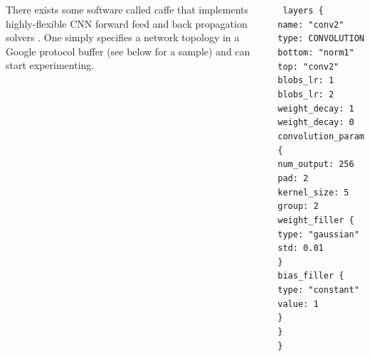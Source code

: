 \documentclass[25pt, a0paper, portrait, margin=0mm, innermargin=15mm,
     blockverticalspace=15mm, colspace=12mm, orientation=landscape]{tikzposter} %
\begin{document}
\begin{columns}
{        \hspace{2em}There exists some software called caffe that implements highly-flexible CNN forward feed and back propagation solvers \cite{caffe}. One simply specifies a network topology in a Google protocol buffer (see below for a sample) and can start experimenting.

\begin{center}
\scriptsize \texttt{
 layers \{ \\
 name: "conv2" \\
 type: CONVOLUTION \\
 bottom: "norm1" \\
 top: "conv2" \\
 blobs\_lr: 1 \\
 blobs\_lr: 2 \\
 weight\_decay: 1 \\
 weight\_decay: 0 \\
 convolution\_param \{ \\
 \hspace{3cm}     num\_output: 256 \\
 \hspace{3cm}     pad: 2 \\
 \hspace{3cm}     kernel\_size: 5 \\
 \hspace{3cm}     group: 2 \\
 weight\_filler \{ \\
 \hspace{6cm}     type: "gaussian" \\
 \hspace{6cm}     std: 0.01 \\
 \} \\
 bias\_filler \{ \\
  \hspace{6cm}    type: "constant" \\
 \hspace{6cm}     value: 1 \\
 \} \\
 \} \\
\}
}
\end{center}

}
\end{columns}
\end{document}
